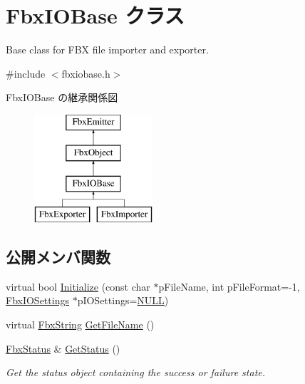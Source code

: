 \hypertarget{class_fbx_i_o_base}{}\section{Fbx\+I\+O\+Base クラス}
\label{class_fbx_i_o_base}


Base class for F\+BX file importer and exporter.  




{\ttfamily \#include $<$fbxiobase.\+h$>$}

Fbx\+I\+O\+Base の継承関係図\begin{figure}[H]
\begin{center}
\leavevmode
\includegraphics[height=4.000000cm]{class_fbx_i_o_base}
\end{center}
\end{figure}
\subsection*{公開メンバ関数}
\begin{DoxyCompactItemize}
\item 
virtual bool \hyperlink{class_fbx_i_o_base_a01d70175d09a1e791e2ce38a9ae3c265}{Initialize} (const char $\ast$p\+File\+Name, int p\+File\+Format=-\/1, \hyperlink{class_fbx_i_o_settings}{Fbx\+I\+O\+Settings} $\ast$p\+I\+O\+Settings=\hyperlink{fbxarch_8h_a070d2ce7b6bb7e5c05602aa8c308d0c4}{N\+U\+LL})
\item 
virtual \hyperlink{class_fbx_string}{Fbx\+String} \hyperlink{class_fbx_i_o_base_ace2742dc782d87dc5bb08bceacb451b7}{Get\+File\+Name} ()
\item 
\hyperlink{class_fbx_status}{Fbx\+Status} \& \hyperlink{class_fbx_i_o_base_a078e47a99b119278ca3ee639e2da5b6d}{Get\+Status} ()
\begin{DoxyCompactList}\small\item\em Get the status object containing the success or failure state. \end{DoxyCompactList}\end{DoxyCompactItemize}

